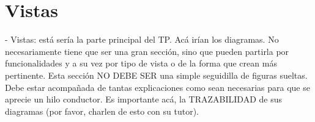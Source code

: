 \section{Vistas}
- Vistas: está sería la parte principal del TP. Acá irían los diagramas. No necesariamente tiene que ser una gran sección, sino que pueden partirla por funcionalidades y a su vez por tipo de vista o de la forma que crean
más pertinente. Esta sección NO DEBE SER una simple seguidilla de figuras sueltas. Debe estar acompañada de tantas explicaciones como sean necesarias para que se aprecie un hilo conductor. Es importante acá, la TRAZABILIDAD de sus diagramas (por favor, charlen de esto con su tutor).

\newpage

\newpage

\newpage

\newpage

\newpage

